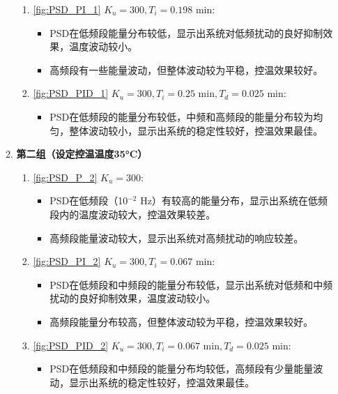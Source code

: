\documentclass[dvipsnames, svgnames,a4paper,11pt]{article}
\begin{document}
\begin{enumerate}
\begin{enumerate}
\begin{enumerate}
                \item \cref{fig:PSD_PI_1} \( K_u = 300, T_i = 0.198 \text{ min} \):
                \begin{itemize}
                    \item PSD在低频段能量分布较低，显示出系统对低频扰动的良好抑制效果，温度波动较小。
                    \item 高频段有一些能量波动，但整体波动较为平稳，控温效果较好。
                \end{itemize}
                
                \item \cref{fig:PSD_PID_1} \( K_u = 300, T_i = 0.25 \text{ min}, T_d = 0.025 \text{ min} \):
                \begin{itemize}
                    \item PSD在低频段的能量分布较低，中频和高频段的能量分布较为均匀，整体波动较小，显示出系统的稳定性较好，控温效果最佳。
                \end{itemize}
            \end{enumerate}
        
            \item \textbf{第二组（设定控温温度35°C）}
            \begin{enumerate}
                \item \cref{fig:PSD_P_2} \( K_u = 300 \):
                \begin{itemize}
                    \item PSD在低频段（10$^{-2}$ Hz）有较高的能量分布，显示出系统在低频段内的温度波动较大，控温效果较差。
                    \item 高频段能量波动较大，显示出系统对高频扰动的响应较差。
                \end{itemize}
                
                \item \cref{fig:PSD_PI_2} \( K_u = 300, T_i = 0.067 \text{ min} \):
                \begin{itemize}
                    \item PSD在低频段和中频段的能量分布较低，显示出系统对低频和中频扰动的良好抑制效果，温度波动较小。
                    \item 高频段能量分布较高，但整体波动较为平稳，控温效果较好。
                \end{itemize}
                
                \item \cref{fig:PSD_PID_2} \( K_u = 300, T_i = 0.067 \text{ min}, T_d = 0.025 \text{ min} \):
                \begin{itemize}
                    \item PSD在低频段和中频段的能量分布均较低，高频段有少量能量波动，显示出系统的稳定性较好，控温效果最佳。
                \end{itemize}
            \end{enumerate}
        

\end{enumerate}
\end{enumerate}
\end{document}
